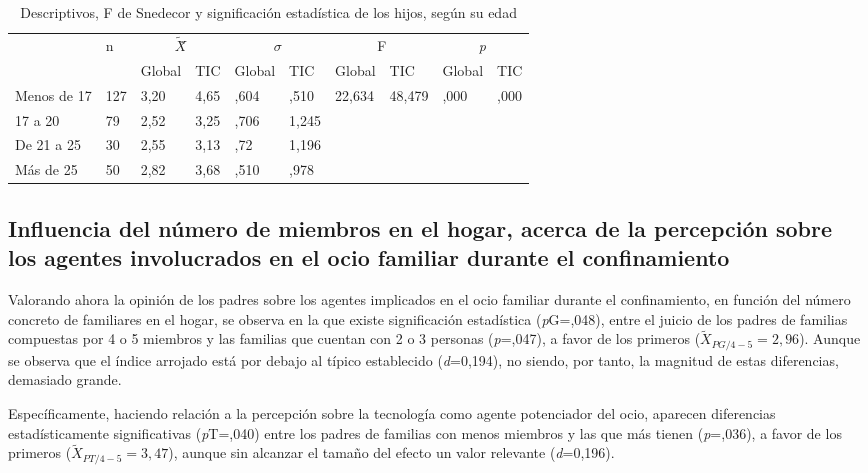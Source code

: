\documentclass[spanish]{textolivre}
\begin{document}
\begin{table}[htpb]
\caption{Descriptivos, F de Snedecor y significación estadística de los hijos, según su edad}
\label{tab4}
\centering
\begin{tabular}{llllllllll}
\toprule
& \multirow{2}{*}{n} & \multicolumn{2}{c}{$\tilde{X}$̃} & \multicolumn{2}{c}{\begin{math}\sigma\end{math}} & \multicolumn{2}{c}{F} & \multicolumn{2}{c}{\emph{p}}
\\
& & Global & TIC & Global & TIC & Global & TIC & Global & TIC
\\
\midrule
Menos de 17 & 127 & 3,20 & 4,65 & ,604 & ,510 & 22,634 & 48,479 & ,000 & ,000
\\
17 a 20 & 79 & 2,52 & 3,25 & ,706 & 1,245 & & & &	 	 	 
\\
De 21 a 25  & 30 & 2,55 & 3,13 & ,72 & 1,196	 	 	 	 
\\
Más de 25 & 50 & 2,82 & 3,68 & ,510 & ,978	 	 	 	 
\\
\bottomrule
\end{tabular}
\centering
{}
\end{table}

\subsection{Influencia del número de miembros en el hogar, acerca de la percepción sobre los agentes involucrados en el ocio familiar durante el confinamiento}
Valorando ahora la opinión de los padres sobre los agentes implicados en el ocio familiar durante el confinamiento, en función del número concreto de familiares en el hogar, se observa en la  que existe significación estadística (\emph{p}G=,048), entre el juicio de los padres de familias compuestas por 4 o 5 miembros y las familias que cuentan con 2 o 3 personas (\emph{p}=,047), a favor de los primeros ($\tilde{X}_{PG/4-5}=2,96$). Aunque se observa que el índice arrojado está por debajo al típico establecido (\emph{d}=0,194), no siendo, por tanto, la magnitud de estas diferencias, demasiado grande.

Específicamente, haciendo relación a la percepción sobre la tecnología como agente potenciador del ocio, aparecen diferencias estadísticamente significativas (\emph{p}T=,040) entre los padres de familias con menos miembros y las que más tienen (\emph{p}=,036), a favor de los primeros ($\tilde{X}_{PT/4-5}=3,47$), aunque sin alcanzar el tamaño del efecto un valor relevante (\emph{d}=0,196).
\end{document}
